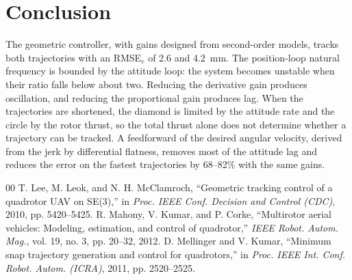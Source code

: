 \documentclass[conference]{IEEEtran}
\begin{document}
\section{Conclusion}
The geometric controller, with gains designed from second-order models,
tracks both trajectories with an RMSE$_e$ of 2.6 and 4.2~mm. The
position-loop natural frequency is bounded by the attitude loop: the system
becomes unstable when their ratio falls below about two. Reducing the
derivative gain produces oscillation, and reducing the proportional gain
produces lag. When the trajectories are shortened, the diamond is limited by
the attitude rate and the circle by the rotor thrust, so the total thrust
alone does not determine whether a trajectory can be tracked. A feedforward
of the desired angular velocity, derived from the jerk by differential
flatness, removes most of the attitude lag and reduces the error on the
fastest trajectories by 68--82\% with the same gains.

\begin{thebibliography}{00}
 T. Lee, M. Leok, and N. H. McClamroch, ``Geometric tracking
control of a quadrotor UAV on SE(3),'' in \textit{Proc. IEEE Conf. Decision
and Control (CDC)}, 2010, pp. 5420--5425.
 R. Mahony, V. Kumar, and P. Corke, ``Multirotor aerial
vehicles: Modeling, estimation, and control of quadrotor,'' \textit{IEEE
Robot. Autom. Mag.}, vol. 19, no. 3, pp. 20--32, 2012.
 D. Mellinger and V. Kumar, ``Minimum snap trajectory
generation and control for quadrotors,'' in \textit{Proc. IEEE Int. Conf.
Robot. Autom. (ICRA)}, 2011, pp. 2520--2525.
\end{thebibliography}
\end{document}

